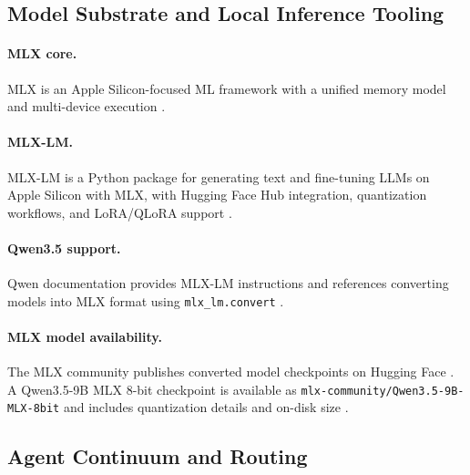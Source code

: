 \documentclass[11pt]{article}
\begin{document}
\subsection{Model Substrate and Local Inference Tooling}

\paragraph{MLX core.}
MLX is an Apple Silicon-focused ML framework with a unified memory model and multi-device execution \cite{MLX_GitHub, MLX_Docs}.

\paragraph{MLX-LM.}
MLX-LM is a Python package for generating text and fine-tuning LLMs on Apple Silicon with MLX, with Hugging Face Hub integration, quantization workflows, and LoRA/QLoRA support \cite{MLXLM_Readme, MLXLM_LoRA}.

\paragraph{Qwen3.5 support.}
Qwen documentation provides MLX-LM instructions and references converting models into MLX format using \texttt{mlx\_lm.convert} \cite{Qwen_MLXLM_Docs}.

\paragraph{MLX model availability.}
The MLX community publishes converted model checkpoints on Hugging Face \cite{MLXLM_Readme}.
A Qwen3.5-9B MLX 8-bit checkpoint is available as \texttt{mlx-community/Qwen3.5-9B-MLX-8bit} and includes quantization details and on-disk size \cite{MLXCommunity_Qwen35_9B_MLX8}.

\subsection{Agent Continuum and Routing}
\end{document}

